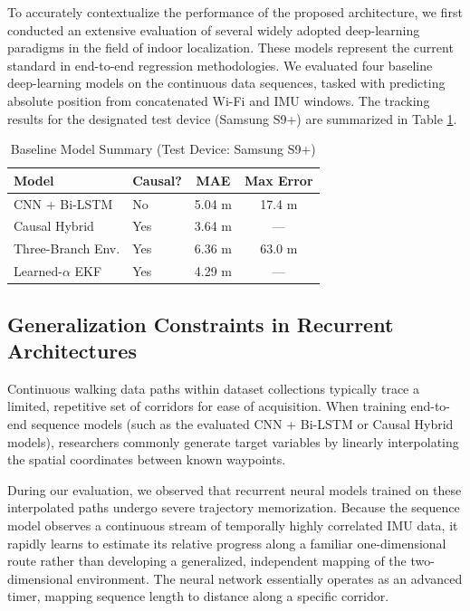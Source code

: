 \documentclass[conference]{IEEEtran}
\begin{document}
To accurately contextualize the performance of the proposed architecture, we first conducted an extensive evaluation of several widely adopted deep-learning paradigms in the field of indoor localization. These models represent the current standard in end-to-end regression methodologies. We evaluated four baseline deep-learning models on the continuous data sequences, tasked with predicting absolute position from concatenated Wi-Fi and IMU windows. The tracking results for the designated test device (Samsung S9+) are summarized in Table \ref{tab:baselines}.

\begin{table}[htbp]
\caption{Baseline Model Summary (Test Device: Samsung S9+)}
\label{tab:baselines}
\centering
\begin{tabular}{@{}llcc@{}}
\toprule
\textbf{Model} & \textbf{Causal?} & \textbf{MAE} & \textbf{Max Error} \\ \midrule
CNN + Bi-LSTM & No & 5.04 m & 17.4 m \\
Causal Hybrid & Yes & 3.64 m & --- \\
Three-Branch Env. & Yes & 6.36 m & 63.0 m \\
Learned-$\alpha$ EKF & Yes & 4.29 m & --- \\ \bottomrule
\end{tabular}
\end{table}

\subsection{Generalization Constraints in Recurrent Architectures}

Continuous walking data paths within dataset collections typically trace a limited, repetitive set of corridors for ease of acquisition. When training end-to-end sequence models (such as the evaluated CNN + Bi-LSTM or Causal Hybrid models), researchers commonly generate target variables by linearly interpolating the spatial coordinates between known waypoints. 

During our evaluation, we observed that recurrent neural models trained on these interpolated paths undergo severe trajectory memorization. Because the sequence model observes a continuous stream of temporally highly correlated IMU data, it rapidly learns to estimate its relative progress along a familiar one-dimensional route rather than developing a generalized, independent mapping of the two-dimensional environment. The neural network essentially operates as an advanced timer, mapping sequence length to distance along a specific corridor. 
\end{document}

